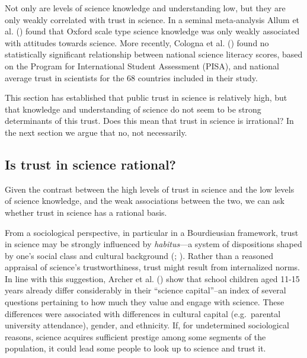 \documentclass[
  jou,
  floatsintext,
  longtable,
  nolmodern,
  notxfonts,
  notimes,
  colorlinks=true,linkcolor=blue,citecolor=blue,urlcolor=blue]{apa7}
\begin{document}
Not only are levels of science knowledge and understanding low, but they
are only weakly correlated with trust in science. In a seminal
meta-analysis Allum et al.
() found that
Oxford scale type science knowledge was only weakly associated with
attitudes towards science. More recently, Cologna et al.
() found no
statistically significant relationship between national science literacy
scores, based on the Program for International Student Assessment
(PISA), and national average trust in scientists for the 68 countries
included in their study.

This section has established that public trust in science is relatively
high, but that knowledge and understanding of science do not seem to be
strong determinants of this trust. Does this mean that trust in science
is irrational? In the next section we argue that no, not necessarily.

\subsection{Is trust in science
rational?}\label{is-trust-in-science-rational}

Given the contrast between the high levels of trust in science and the
low levels of science knowledge, and the weak associations between the
two, we can ask whether trust in science has a rational basis.

From a sociological perspective, in particular in a Bourdieusian
framework, trust in science may be strongly influenced by
\emph{habitus}---a system of dispositions shaped by one's social class
and cultural background
(; ). Rather than a reasoned appraisal of science's trustworthiness,
trust might result from internalized norms. In line with this
suggestion, Archer et al.
() show that
school children aged 11-15 years already differ considerably in their
``science capital''--an index of several questions pertaining to how
much they value and engage with science. These differences were
associated with differences in cultural capital (e.g.~parental
university attendance), gender, and ethnicity. If, for undetermined
sociological reasons, science acquires sufficient prestige among some
segments of the population, it could lead some people to look up to
science and trust it.
\end{document}
